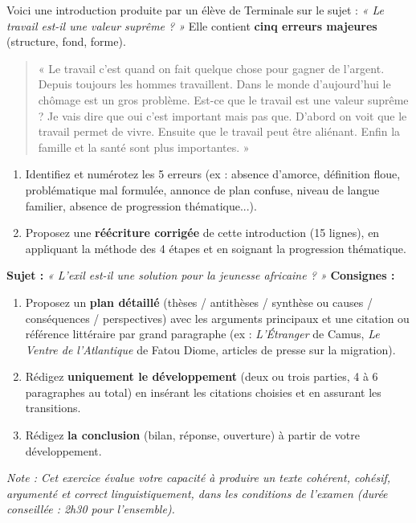 \documentclass[11pt]{article}
\begin{document}
\begin{exercice}
Voici une introduction produite par un élève de Terminale sur le sujet : \emph{« Le travail est-il une valeur suprême ? »} Elle contient \textbf{cinq erreurs majeures} (structure, fond, forme).
\begin{quote}
« Le travail c'est quand on fait quelque chose pour gagner de l'argent. Depuis toujours les hommes travaillent. Dans le monde d'aujourd'hui le chômage est un gros problème. Est-ce que le travail est une valeur suprême ? Je vais dire que oui c'est important mais pas que. D'abord on voit que le travail permet de vivre. Ensuite que le travail peut être aliénant. Enfin la famille et la santé sont plus importantes. »
\end{quote}
\begin{enumerate}
\item Identifiez et numérotez les 5 erreurs (ex : absence d'amorce, définition floue, problématique mal formulée, annonce de plan confuse, niveau de langue familier, absence de progression thématique...).
\item Proposez une \textbf{réécriture corrigée} de cette introduction (15 lignes), en appliquant la méthode des 4 étapes et en soignant la progression thématique.
\end{enumerate}
\end{exercice}

\begin{exercice}
\textbf{Sujet :} \emph{« L'exil est-il une solution pour la jeunesse africaine ? »}
\textbf{Consignes :}
\begin{enumerate}
\item Proposez un \textbf{plan détaillé} (thèses / antithèses / synthèse ou causes / conséquences / perspectives) avec les arguments principaux et une citation ou référence littéraire par grand paragraphe (ex : \textit{L'Étranger} de Camus, \textit{Le Ventre de l'Atlantique} de Fatou Diome, articles de presse sur la migration).
\item Rédigez \textbf{uniquement le développement} (deux ou trois parties, 4 à 6 paragraphes au total) en insérant les citations choisies et en assurant les transitions.
\item Rédigez \textbf{la conclusion} (bilan, réponse, ouverture) à partir de votre développement.
\end{enumerate}
\textit{Note : Cet exercice évalue votre capacité à produire un texte cohérent, cohésif, argumenté et correct linguistiquement, dans les conditions de l'examen (durée conseillée : 2h30 pour l'ensemble).}
\end{exercice}
\end{document}
